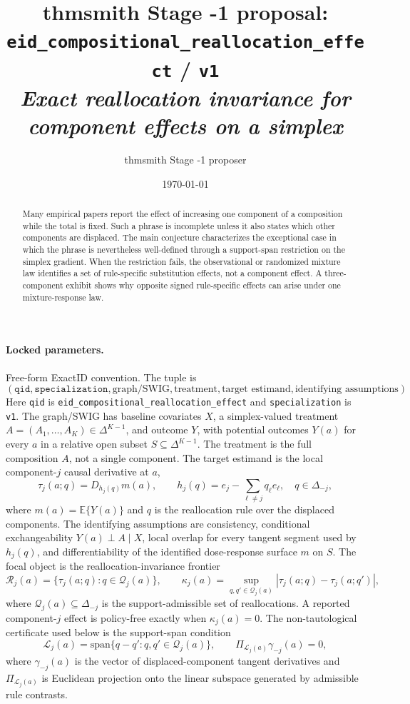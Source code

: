 \documentclass[11pt]{article}
\title{thmsmith Stage -1 proposal: \texttt{eid\_compositional\_reallocation\_effect} / \texttt{v1}%
  \\ \large\textit{Exact reallocation invariance for component effects on a simplex}}
\author{thmsmith Stage -1 proposer}
\date{\today}
\newcommand{\E}{\mathbb{E}}
\theoremstyle{definition}
\theoremstyle{plain}
\theoremstyle{remark}
\begin{document}
\maketitle


\paragraph{Locked parameters.}
Free-form ExactID convention. The tuple is
\[
(\texttt{qid},\texttt{specialization},\text{graph/SWIG},\text{treatment},
\text{target estimand},\text{identifying assumptions}).
\]
Here \texttt{qid} is \texttt{eid\_compositional\_reallocation\_effect} and \texttt{specialization} is \texttt{v1}. The graph/SWIG has baseline covariates \(X\), a simplex-valued treatment \(A=(A_1,\ldots,A_K)\in\Delta^{K-1}\), and outcome \(Y\), with potential outcomes \(Y(a)\) for every \(a\) in a relative open subset \(S\subseteq\Delta^{K-1}\). The treatment is the full composition \(A\), not a single component. The target estimand is the local component-\(j\) causal derivative at \(a\),
\[
\tau_j(a;q)=D_{h_j(q)} m(a),\qquad
h_j(q)=e_j-\sum_{\ell\neq j} q_\ell e_\ell,\quad
q\in\Delta_{-j},
\]
where \(m(a)=\E\{Y(a)\}\) and \(q\) is the reallocation rule over the displaced components. The identifying assumptions are consistency, conditional exchangeability \(Y(a)\perp A\mid X\), local overlap for every tangent segment used by \(h_j(q)\), and differentiability of the identified dose-response surface \(m\) on \(S\).
The focal object is the reallocation-invariance frontier
\[
\mathcal{R}_j(a)=\{\tau_j(a;q):q\in\mathcal{Q}_j(a)\},\qquad
\kappa_j(a)=\sup_{q,q'\in\mathcal{Q}_j(a)}|\tau_j(a;q)-\tau_j(a;q')|,
\]
where \(\mathcal{Q}_j(a)\subseteq\Delta_{-j}\) is the support-admissible set of reallocations. A reported component-\(j\) effect is policy-free exactly when \(\kappa_j(a)=0\).
The non-tautological certificate used below is the support-span condition
\[
\mathcal{L}_j(a)=\mathrm{span}\{q-q':q,q'\in\mathcal{Q}_j(a)\},\qquad
\Pi_{\mathcal{L}_j(a)}\gamma_{-j}(a)=0,
\]
where \(\gamma_{-j}(a)\) is the vector of displaced-component tangent derivatives and \(\Pi_{\mathcal{L}_j(a)}\) is Euclidean projection onto the linear subspace generated by admissible rule contrasts.

\begin{abstract}
Many empirical papers report the effect of increasing one component of a composition while the total is fixed. Such a phrase is incomplete unless it also states which other components are displaced. The main conjecture characterizes the exceptional case in which the phrase is nevertheless well-defined through a support-span restriction on the simplex gradient. When the restriction fails, the observational or randomized mixture law identifies a set of rule-specific substitution effects, not a component effect. A three-component exhibit shows why opposite signed rule-specific effects can arise under one mixture-response law.
\end{abstract}
\end{document}
